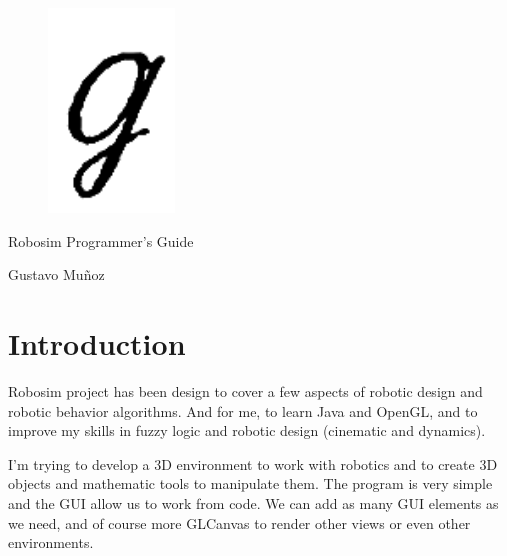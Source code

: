 \documentclass[12pt,a4paper,oneside,english]{book}
\begin{document}
\frontmatter


\begin{titlepage}

\begin{figure}[h]  %
\begin{center}
\includegraphics[width=0.30\textwidth]{images/Logo.png}
\end{center}
\end{figure}

\vspace{5mm}
\begin{center}
\Huge
Robosim Programmer's Guide
\end{center}

\vspace{20mm}
\begin{center}
Gustavo Mu\~{n}oz
\end{center}

\end{titlepage}

\tableofcontents
\listoffigures
\listoftables


\chapter{Introduction}

Robosim project has been design to cover a few aspects of robotic design and robotic behavior algorithms. And for me, to learn Java and OpenGL, and to improve my skills in fuzzy logic and robotic design (cinematic and dynamics).

I'm trying to develop a 3D environment to work with robotics and to create 3D objects and mathematic tools to manipulate them. The program is very simple and the GUI allow us to work from code. We can add as many GUI elements as we need, and of course more GLCanvas to render other views or even other environments.
\end{document}
